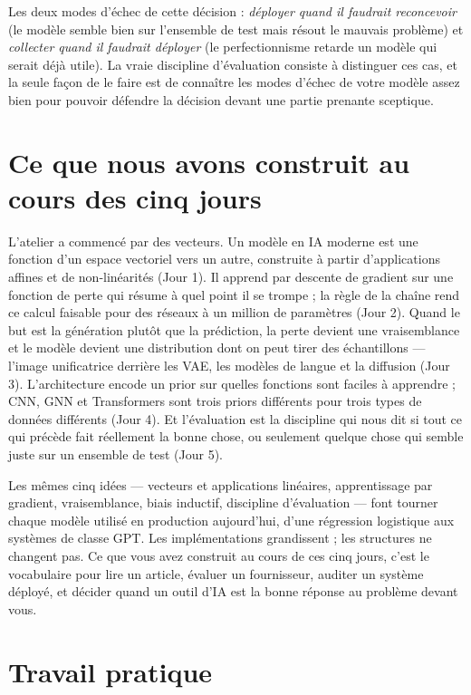 Les deux modes d'échec de cette décision : \emph{déployer quand il faudrait reconcevoir} (le modèle semble bien sur l'ensemble de test mais résout le mauvais problème) et \emph{collecter quand il faudrait déployer} (le perfectionnisme retarde un modèle qui serait déjà utile). La vraie discipline d'évaluation consiste à distinguer ces cas, et la seule façon de le faire est de connaître les modes d'échec de votre modèle assez bien pour pouvoir défendre la décision devant une partie prenante sceptique.

\section{Ce que nous avons construit au cours des cinq jours}

L'atelier a commencé par des vecteurs. Un modèle en IA moderne est une fonction d'un espace vectoriel vers un autre, construite à partir d'applications affines et de non-linéarités (Jour 1). Il apprend par descente de gradient sur une fonction de perte qui résume à quel point il se trompe ; la règle de la chaîne rend ce calcul faisable pour des réseaux à un million de paramètres (Jour 2). Quand le but est la génération plutôt que la prédiction, la perte devient une vraisemblance et le modèle devient une distribution dont on peut tirer des échantillons --- l'image unificatrice derrière les VAE, les modèles de langue et la diffusion (Jour 3). L'architecture encode un prior sur quelles fonctions sont faciles à apprendre ; CNN, GNN et Transformers sont trois priors différents pour trois types de données différents (Jour 4). Et l'évaluation est la discipline qui nous dit si tout ce qui précède fait réellement la bonne chose, ou seulement quelque chose qui semble juste sur un ensemble de test (Jour 5).

Les mêmes cinq idées --- vecteurs et applications linéaires, apprentissage par gradient, vraisemblance, biais inductif, discipline d'évaluation --- font tourner chaque modèle utilisé en production aujourd'hui, d'une régression logistique aux systèmes de classe GPT. Les implémentations grandissent ; les structures ne changent pas. Ce que vous avez construit au cours de ces cinq jours, c'est le vocabulaire pour lire un article, évaluer un fournisseur, auditer un système déployé, et décider quand un outil d'IA est la bonne réponse au problème devant vous.

\section*{Travail pratique}

